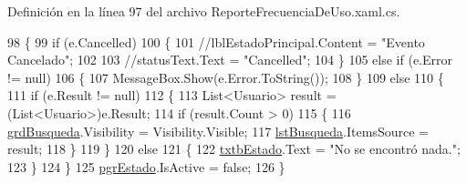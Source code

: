 Definición en la línea 97 del archivo Reporte\-Frecuencia\-De\-Uso.\-xaml.\-cs.


\begin{DoxyCode}
98         \{
99             \textcolor{keywordflow}{if} (e.Cancelled)
100             \{
101                 \textcolor{comment}{//lblEstadoPrincipal.Content = "Evento Cancelado";}
102 
103                 \textcolor{comment}{//statusText.Text = "Cancelled";}
104             \}
105             \textcolor{keywordflow}{else} \textcolor{keywordflow}{if} (e.Error != null)
106             \{
107                 MessageBox.Show(e.Error.ToString());
108             \}
109             \textcolor{keywordflow}{else}
110             \{
111                 \textcolor{keywordflow}{if} (e.Result != null)
112                 \{
113                     List<Usuario> result = (List<Usuario>)e.Result;
114                     if (result.Count > 0)
115                     \{
116                         \hyperlink{class_proyecto___integrador__3_1_1_reportes_1_1_reporte_frecuencia_de_uso_af86d8cdcb91a2f6d6954bf44f4ad2b6c}{grdBusqueda}.Visibility = Visibility.Visible;
117                         \hyperlink{class_proyecto___integrador__3_1_1_reportes_1_1_reporte_frecuencia_de_uso_a94c9a9f5043efbb40679b90827da897e}{lstBusqueda}.ItemsSource = result;
118                     \}
119                 \}
120                 \textcolor{keywordflow}{else}
121                 \{
122                     \hyperlink{class_proyecto___integrador__3_1_1_reportes_1_1_reporte_frecuencia_de_uso_ab5dad4dbd48cba1238ec0914d940c499}{txtbEstado}.Text = \textcolor{stringliteral}{"No se encontró nada."};
123                 \}
124             \}
125             \hyperlink{class_proyecto___integrador__3_1_1_reportes_1_1_reporte_frecuencia_de_uso_a40046fa9e14c98adb20dbc8f99f83842}{pgrEstado}.IsActive = \textcolor{keyword}{false};
126         \}
\end{DoxyCode}
